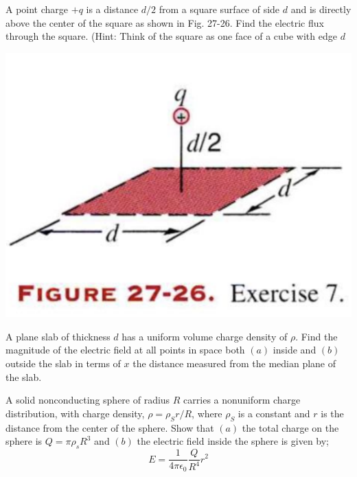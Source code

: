 \documentclass[11pt,letterpaper,boxed]{hmcpset}
\begin{document}
\begin{solution}
\vfill
\end{solution}
\newpage

\begin{problem}[HRK P27.7]
A point charge $+q$ is a distance $d/2$ from a square surface of side $d$ and is directly above the center of the square as shown in Fig. 27-26. Find the electric flux through the square. (Hint: Think of the square as one face of a cube with edge $d$ 
\begin{center}
\includegraphics[scale=0.6]{27-26.png}
\end{center} 

\end{problem}

\begin{solution}
\vfill
\end{solution}
\newpage

\begin{problem}[HRK P27.16	]
A plane slab of thickness $d$ has a uniform volume charge density of $\rho$. Find the magnitude of the electric field at all points in space both $(a)$ inside and $(b)$ outside the slab in terms of $x$ the distance measured from the median plane of the slab. 
\end{problem}

\begin{solution}
\vfill
\end{solution}
\newpage

\begin{problem}[HRK P27.17]
A solid nonconducting sphere of radius $R$ carries a nonuniform charge distribution, with charge density, $\rho= \rho_Sr/R$, where $\rho_S$ is a constant and $r$ is the distance from the center of the sphere. Show that $(a)$ the total charge on the sphere  is $Q= \pi \rho_sR^3$ and $(b)$ the electric field inside the sphere is given by; 
$$ E = \frac{1}{4\pi \epsilon_0}\frac{Q}{R^4}r^2$$
\end{problem}
\end{document}
